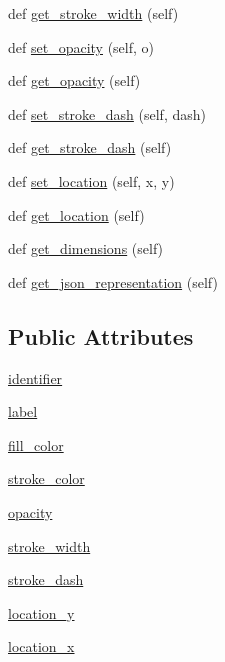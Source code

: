 \begin{DoxyCompactItemize}
def \mbox{\hyperlink{class_bridges_1_1symbol_1_1_symbol_a3cec655755ddab9cfea29d0a3e5cc3ab}{get\+\_\+stroke\+\_\+width}} (self)
\item 
def \mbox{\hyperlink{class_bridges_1_1symbol_1_1_symbol_acdd20b04b5048a2fcac4397a334f617d}{set\+\_\+opacity}} (self, o)
\item 
def \mbox{\hyperlink{class_bridges_1_1symbol_1_1_symbol_aad6d83d8c566e5fa39fcfb1345303081}{get\+\_\+opacity}} (self)
\item 
def \mbox{\hyperlink{class_bridges_1_1symbol_1_1_symbol_a7f5b3b7bea8583f1b62bda78cfd6fdd9}{set\+\_\+stroke\+\_\+dash}} (self, dash)
\item 
def \mbox{\hyperlink{class_bridges_1_1symbol_1_1_symbol_aaf2333ce8bb554e099a9255d7339099a}{get\+\_\+stroke\+\_\+dash}} (self)
\item 
def \mbox{\hyperlink{class_bridges_1_1symbol_1_1_symbol_a3433212524654ab171aaba603642118f}{set\+\_\+location}} (self, x, y)
\item 
def \mbox{\hyperlink{class_bridges_1_1symbol_1_1_symbol_afb19293038b12e5a99528da7d23a39d8}{get\+\_\+location}} (self)
\item 
def \mbox{\hyperlink{class_bridges_1_1symbol_1_1_symbol_a10e39fcd3d90b45bbc77c95fe4ae280f}{get\+\_\+dimensions}} (self)
\item 
def \mbox{\hyperlink{class_bridges_1_1symbol_1_1_symbol_ae8b3173eee1c6732977bbf2395fb9e51}{get\+\_\+json\+\_\+representation}} (self)
\end{DoxyCompactItemize}
\subsection*{Public Attributes}
\begin{DoxyCompactItemize}
\item 
\mbox{\hyperlink{class_bridges_1_1symbol_1_1_symbol_a7f63dbea4b0eab72e121367d9ebfbedc}{identifier}}
\item 
\mbox{\hyperlink{class_bridges_1_1symbol_1_1_symbol_a271c2a9ba1b41c143af4192bfaf02ff4}{label}}
\item 
\mbox{\hyperlink{class_bridges_1_1symbol_1_1_symbol_a0c764842d581f3aabed97368837cfeba}{fill\+\_\+color}}
\item 
\mbox{\hyperlink{class_bridges_1_1symbol_1_1_symbol_aa0e4a61c8d77532b072d608c00e7a7be}{stroke\+\_\+color}}
\item 
\mbox{\hyperlink{class_bridges_1_1symbol_1_1_symbol_ad630b7cc4dfbf56f0eeb01430d2f988b}{opacity}}
\item 
\mbox{\hyperlink{class_bridges_1_1symbol_1_1_symbol_a44ba84d33800816e0f2696739673190e}{stroke\+\_\+width}}
\item 
\mbox{\hyperlink{class_bridges_1_1symbol_1_1_symbol_a3d8c7205acaf7a5d5cdbf0f2e0918dd7}{stroke\+\_\+dash}}
\item 
\mbox{\hyperlink{class_bridges_1_1symbol_1_1_symbol_a4cd3a5d0c4029805ebf7cd9c98bec227}{location\+\_\+y}}
\item 
\mbox{\hyperlink{class_bridges_1_1symbol_1_1_symbol_a9e39005d7c368fd598f19bd42e51d6dd}{location\+\_\+x}}
\end{DoxyCompactItemize}
